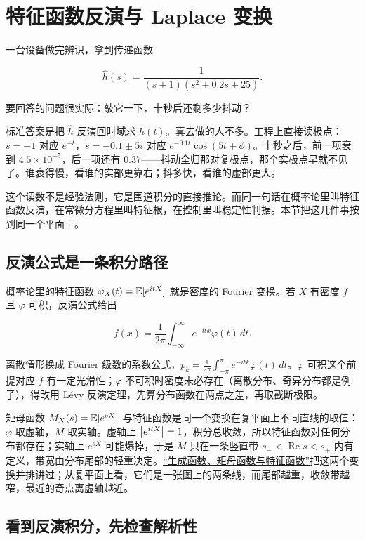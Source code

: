 \section{特征函数反演与 Laplace 变换}
\label{sec:08-Numerical-Analysis/09-Complex-Analysis-and-Residues/03}

一台设备做完辨识，拿到传递函数

\[
\hat h(s)=\frac{1}{(s+1)(s^2+0.2s+25)} .
\]

要回答的问题很实际：敲它一下，十秒后还剩多少抖动？

标准答案是把 \(\hat h\) 反演回时域求 \(h(t)\)。真去做的人不多。工程上直接读极点：\(s=-1\) 对应 \(e^{-t}\)，\(s=-0.1\pm 5i\) 对应 \(e^{-0.1t}\cos(5t+\phi)\)。十秒之后，前一项衰到 \(4.5\times10^{-5}\)，后一项还有 \(0.37\)——抖动全归那对复极点，那个实极点早就不见了。谁衰得慢，看谁的实部更靠右；抖多快，看谁的虚部更大。

这个读数不是经验法则，它是围道积分的直接推论。而同一句话在概率论里叫特征函数反演，在常微分方程里叫特征根，在控制里叫稳定性判据。本节把这几件事按到同一个平面上。

\subsection{反演公式是一条积分路径}

概率论里的特征函数 \(\varphi_X(t)=\mathbb{E}[e^{itX}]\) 就是密度的 Fourier 变换。若 \(X\) 有密度 \(f\) 且 \(\varphi\) 可积，反演公式给出

\[
f(x)=\frac1{2\pi}\int_{-\infty}^{\infty}e^{-itx}\varphi(t)\,dt .
\]

离散情形换成 Fourier 级数的系数公式，\(p_k=\frac1{2\pi}\int_{-\pi}^{\pi}e^{-itk}\varphi(t)\,dt\)。\(\varphi\) 可积这个前提对应 \(f\) 有一定光滑性；\(\varphi\) 不可积时密度未必存在（离散分布、奇异分布都是例子），得改用 Lévy 反演定理，先算分布函数在两点之差，再取截断极限。

矩母函数 \(M_X(s)=\mathbb{E}[e^{sX}]\) 与特征函数是同一个变换在复平面上不同直线的取值：\(\varphi\) 取虚轴，\(M\) 取实轴。虚轴上 \(\left|e^{itX}\right|=1\)，积分总收敛，所以特征函数对任何分布都存在；实轴上 \(e^{sX}\) 可能爆掉，于是 \(M\) 只在一条竖直带 \(s_-<\operatorname{Re}s<s_+\) 内有定义，带宽由分布尾部的轻重决定。\hyperref[sec:05-Probability/07-Transforms-and-Bounds/01]{``生成函数、矩母函数与特征函数''}把这两个变换并排讲过；从复平面上看，它们是一张图上的两条线，而尾部越重，收敛带越窄，最近的奇点离虚轴越近。

\subsection{看到反演积分，先检查解析性}

